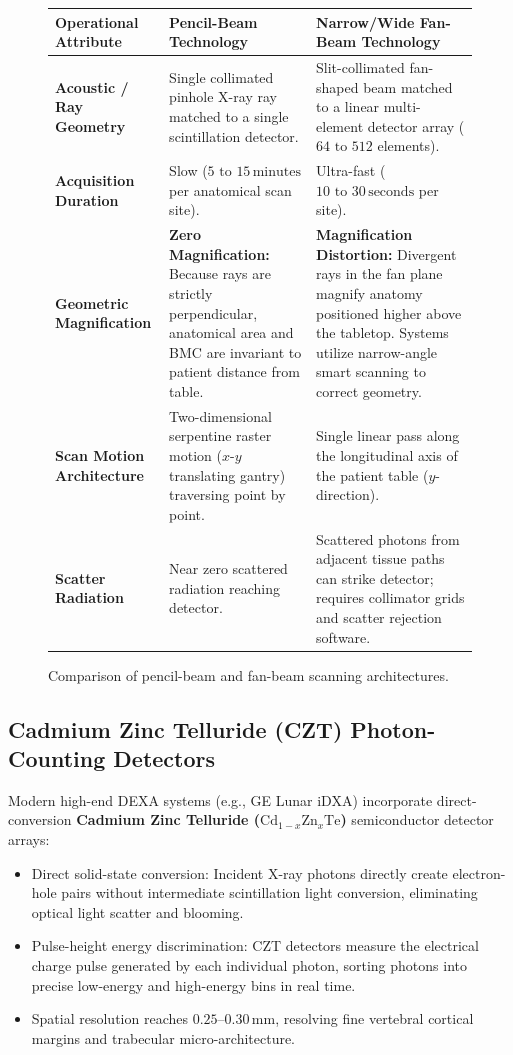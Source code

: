 \documentclass[11pt,a4paper]{article}
\begin{document}
\begin{figure}[htbp]
\centering
\setlength{\tabcolsep}{4pt}
\begin{tabular}{p{3.5cm}p{5.6cm}p{5.6cm}}
\toprule
\textbf{Operational Attribute} & \textbf{Pencil-Beam Technology} & \textbf{Narrow/Wide Fan-Beam Technology} \\
\midrule
\textbf{Acoustic / Ray Geometry} & Single collimated pinhole X-ray ray matched to a single scintillation detector. & Slit-collimated fan-shaped beam matched to a linear multi-element detector array ($64\text{ to }512$ elements). \\
\addlinespace
\textbf{Acquisition Duration} & Slow ($5\text{ to }15\,\text{minutes}$ per anatomical scan site). & Ultra-fast ($10\text{ to }30\,\text{seconds}$ per site). \\
\addlinespace
\textbf{Geometric Magnification} & \textbf{Zero Magnification:} Because rays are strictly perpendicular, anatomical area and BMC are invariant to patient distance from table. & \textbf{Magnification Distortion:} Divergent rays in the fan plane magnify anatomy positioned higher above the tabletop. Systems utilize narrow-angle smart scanning to correct geometry. \\
\addlinespace
\textbf{Scan Motion Architecture} & Two-dimensional serpentine raster motion ($x\text{-}y$ translating gantry) traversing point by point. & Single linear pass along the longitudinal axis of the patient table ($y$-direction). \\
\addlinespace
\textbf{Scatter Radiation} & Near zero scattered radiation reaching detector. & Scattered photons from adjacent tissue paths can strike detector; requires collimator grids and scatter rejection software. \\
\bottomrule
\end{tabular}
\caption{Comparison of pencil-beam and fan-beam scanning architectures.}
\label{tab:pencil_fan}
\end{figure}

\subsection{Cadmium Zinc Telluride (CZT) Photon-Counting Detectors}

Modern high-end DEXA systems (e.g., GE Lunar iDXA) incorporate direct-conversion \textbf{Cadmium Zinc Telluride ($\text{Cd}_{1-x}\text{Zn}_x\text{Te}$)} semiconductor detector arrays:
\begin{itemize}[leftmargin=*]
    \item Direct solid-state conversion: Incident X-ray photons directly create electron-hole pairs without intermediate scintillation light conversion, eliminating optical light scatter and blooming.
    \item Pulse-height energy discrimination: CZT detectors measure the electrical charge pulse generated by each individual photon, sorting photons into precise low-energy and high-energy bins in real time.
    \item Spatial resolution reaches $0.25\text{--}0.30\,\text{mm}$, resolving fine vertebral cortical margins and trabecular micro-architecture.
\end{itemize}
\end{document}
